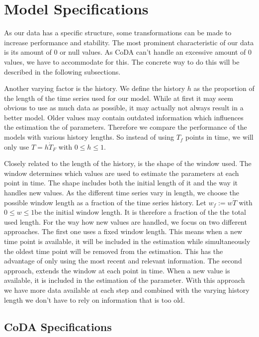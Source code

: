 \section{Model Specifications}
\label{sec: Model Specification}

As our data has a specific structure, some transformations can be made to increase performance and stability. The most prominent characteristic of our data is its amount of 0 or null values. As CoDA can't handle an excessive amount of 0 values, we have to accommodate for this. The concrete way to do this will be described in the following subsections. 

Another varying factor is the history. We define the history $h$ as the proportion of the length of the time series used for our model. While at first it may seem obvious to use as much data as possible, it may actually not always result in a better model. Older values may contain outdated information which influences the estimation the of parameters. Therefore we compare the performance of the models with various history lengths. So instead of using $T_f$ points in time, we will only use $T=h\dot T_F$ with $0\leq h \leq 1$. 

Closely related to the length of the history, is the shape of the window used. The window determines which values are used to estimate the parameters at each point in time. The shape includes both the initial length of it and the way it handles new values. As the different time series vary in length, we choose the possible window length as a fraction of the time series history. Let $w_f:=w \dot T$ with $0\leq w \leq 1$be the initial window length. It is therefore a fraction of the the total used length. For the way how new values are handled, we focus on two different approaches. The first one uses a fixed window length. This means when a new time point is available, it will be included in the estimation while simultaneously the oldest time point will be removed from the estimation. This has the advantage of only using the most recent and relevant information. The second approach, extends the window at each point in time. When a new value is available, it is included in the estimation of the parameter. With this approach we have more data available at each step and combined with the varying history length we don't have to rely on information that is too old.

\subsection{CoDA Specifications}
\label{sec: Coda Specifications}

